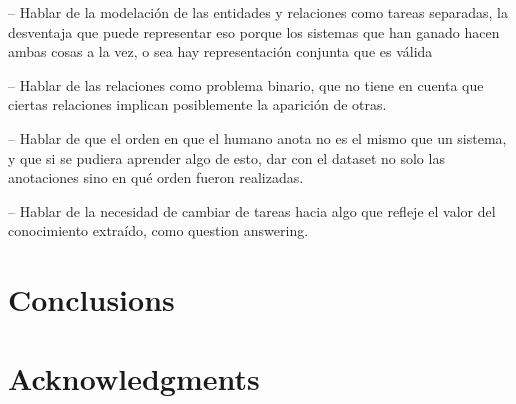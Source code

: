 \documentclass[a4paper,11pt,twocolumn,twoside]{article}
\begin{document}
-- Hablar de la modelación de las entidades y relaciones como tareas separadas,
la desventaja que puede representar eso porque los sistemas que han ganado hacen
ambas cosas a la vez, o sea hay representación conjunta que es válida

-- Hablar de las relaciones como problema binario, que no tiene en cuenta que ciertas
relaciones implican posiblemente la aparición de otras.

-- Hablar de que el orden en que el humano anota no es el mismo que un sistema,
y que si se pudiera aprender algo de esto, dar con el dataset no solo las anotaciones
sino en qué orden fueron realizadas.

-- Hablar de la necesidad de cambiar de tareas hacia algo que refleje el valor
del conocimiento extraído, como question answering.

\section{Conclusions}

\section*{Acknowledgments}



\end{document}
